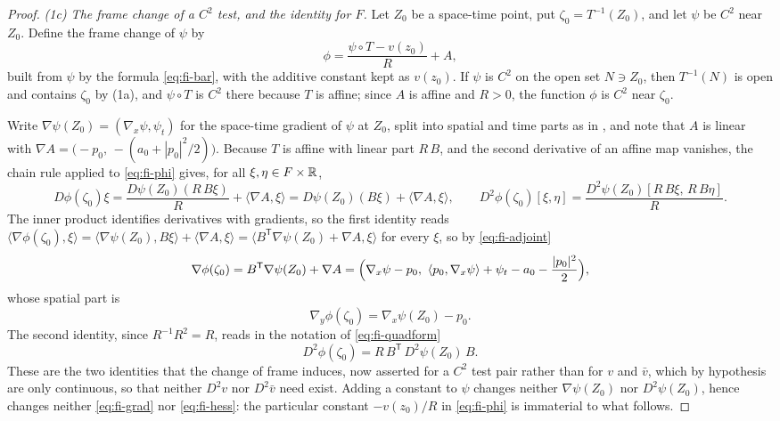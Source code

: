 \begin{proof}
\emph{(1c) The frame change of a $C^2$ test, and the identity for $F$.}
Let $Z_0$ be a space-time point, put $\zeta_0=T^{-1}(Z_0)$, and let $\psi$ be
$C^2$ near $Z_0$. Define the frame change of $\psi$ by
\begin{equation}\label{eq:fi-phi}
  \phi=\frac{\psi\circ T-v(z_0)}R+A ,
\end{equation}
built from $\psi$ by the formula \eqref{eq:fi-bar}, with the additive constant
kept as $v(z_0)$. If $\psi$ is $C^2$ on
the open set $N\ni Z_0$, then $T^{-1}(N)$ is open and contains $\zeta_0$ by
(1a), and $\psi\circ T$ is $C^2$ there because $T$ is affine; since $A$ is
affine and $R>0$, the function $\phi$ is $C^2$ near $\zeta_0$.

Write $\nabla\psi(Z_0)=(\nabla_x\psi,\psi_t)$ for the space-time gradient of
$\psi$ at $Z_0$, split into spatial and time parts as in , and
note that $A$ is linear with
$\nabla A=\bigl(-p_0,\,-(a_0+|p_0|^2/2)\bigr)$. Because $T$ is affine with
linear part $R\,B$, and the second derivative of an affine map vanishes, the
chain rule applied to \eqref{eq:fi-phi} gives, for all $\xi,\eta\in F\times\mathbb{R}$,
\[
  D\phi(\zeta_0)\xi=\frac{D\psi(Z_0)(R\,B\xi)}R+\langle\nabla A,\xi\rangle
   =D\psi(Z_0)(B\xi)+\langle\nabla A,\xi\rangle,
  \qquad
  D^2\phi(\zeta_0)[\xi,\eta]
   =\frac{D^2\psi(Z_0)[R\,B\xi,\,R\,B\eta]}R .
\]
The inner product identifies derivatives with gradients, so the first identity
reads $\langle\nabla\phi(\zeta_0),\xi\rangle
 =\langle\nabla\psi(Z_0),B\xi\rangle+\langle\nabla A,\xi\rangle
 =\langle B^{\mathsf T}\nabla\psi(Z_0)+\nabla A,\xi\rangle$ for every $\xi$, so
by \eqref{eq:fi-adjoint}
\[
  \nabla\phi(\zeta_0)=B^{\mathsf T}\nabla\psi(Z_0)+\nabla A
   =\Bigl(\nabla_x\psi-p_0,\ \langle p_0,\nabla_x\psi\rangle+\psi_t
      -a_0-\frac{|p_0|^2}2\Bigr) ,
\]
whose spatial part is
\begin{equation}\label{eq:fi-grad}
  \nabla_y\phi(\zeta_0)=\nabla_x\psi(Z_0)-p_0 .
\end{equation}
The second identity, since $R^{-1}R^2=R$, reads in the notation of
\eqref{eq:fi-quadform}
\begin{equation}\label{eq:fi-hess}
  D^2\phi(\zeta_0)=R\,B^{\mathsf T}\,D^2\psi(Z_0)\,B .
\end{equation}
These are the two identities that the change of frame induces, now asserted for
a $C^2$ test pair rather than for $v$ and $\bar v$, which by hypothesis are only
continuous, so that neither $D^2v$ nor $D^2\bar v$ need exist. Adding a constant to $\psi$ changes neither $\nabla\psi(Z_0)$ nor
$D^2\psi(Z_0)$, hence changes neither \eqref{eq:fi-grad} nor
\eqref{eq:fi-hess}: the particular constant $-v(z_0)/R$ in \eqref{eq:fi-phi} is
immaterial to what follows.


\end{proof}
